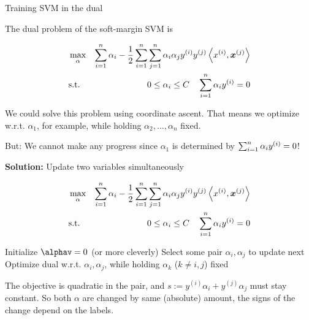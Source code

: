 \begin{vbframe}{Training SVM in the dual}

The dual problem of the soft-margin SVM is

\begin{eqnarray*}
    & \max_{\alpha} & \sum_{i=1}^n \alpha_i - \frac{1}{2}\sum_{i=1}^n\sum_{j=1}^n\alpha_i\alpha_jy^{(i)} y^{(j)} \left\langle x^{(i)}, \bm{x}^{(j)} \right\rangle  \\
    & \text{s.t. } & 0 \le \alpha_i \le C \quad \sum_{i=1}^n \alpha_i y^{(i)} = 0
\end{eqnarray*}

We could solve this problem using coordinate ascent. That means we optimize w.r.t. $\alpha_1$, for example, while holding $\alpha_2, ..., \alpha_n$ fixed.

\lz

But: We cannot make any progress since $\alpha_1$ is determined by $\sum_{i=1}^n \alpha_i y^{(i)} = 0$!

\framebreak
\textbf{Solution:} Update two variables simultaneously
\vspace{-0.2cm}
\begin{footnotesize}  
\begin{eqnarray*}
    & \max_{\alpha} & \sum_{i=1}^n \alpha_i - \frac{1}{2}\sum_{i=1}^n\sum_{j=1}^n\alpha_i\alpha_jy^{(i)} y^{(j)} \left\langle x^{(i)}, \bm{x}^{(j)} \right\rangle  \\
    &  \text{s.t. } & 0 \le \alpha_i \le C \quad \sum_{i=1}^n \alpha_i y^{(i)} = 0
\end{eqnarray*}
\end{footnotesize}  
\vspace{-0.6cm}
\begin{algorithm}[H]
  \caption*{\small Pairwise coordinate ascent in the dual}
  \begin{algorithmic}[1]
    \State Initialize $\alphav = 0$ (or more cleverly)
      \State Select some pair $\alpha_i, \alpha_j$ to update next
      \State Optimize dual w.r.t. $\alpha_i, \alpha_j$, while holding $\alpha_k$ ($k\ne i, j$) fixed
      \EndFor
  \end{algorithmic}
\end{algorithm}
\small
The objective is quadratic in the pair, and $s:=y^{(i)}\alpha_i  + y^{(j)}\alpha_j$ must stay constant.
So both $\alpha$ are changed by same (absolute) amount, the signs of the change depend on the labels.


\end{vbframe}
